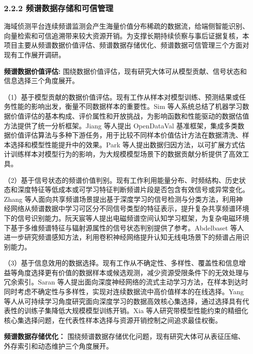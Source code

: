 \subsubsection{2.2.2 频谱数据存储和可信管理}

海域侦测平台连续频谱监测会产生海量价值分布稀疏的数据流，给端侧智能识别、向量检索和可信追溯带来较大资源开销。为支撑长期持续侦察与事后证据复核，本项目主要从频谱数据价值评估、频谱数据存储优化、频谱数据可信管理三个方面对现有工作展开调研。

\textbf{频谱数据价值评估:}
围绕数据价值评估，现有研究大体可从模型贡献、信号状态和信息选择三个角度展开。

（1）基于模型贡献的数据价值评估。现有工作从样本对模型训练、预测结果或任务性能的影响出发，衡量不同数据样本的重要性。Sim 等人\cite{SimXL22}系统总结了机器学习数据价值评估的基本构成、评价属性和开放挑战，为影响函数和性能驱动的数据估值方法提供了统一分析框架。Jiang 等人\cite{JiangLZK23}提出 OpenDataVal 基准框架，集成多类数据价值评估算法与多种下游任务，用于比较不同样本价值估计方法在数据清洗、样本选择和模型性能提升中的效果。Park 等人\cite{ParkGILM23}提出数据归因方法，以可扩展方式估计训练样本对模型行为的影响，为大规模模型场景下的数据贡献分析提供了高效工具。

（2）基于信号状态的频谱价值判别。现有工作利用能量分布、时频结构、历史状态和深度特征等低成本或可学习特征判断频谱片段是否包含有效信号或异常变化。Zhang 等人\cite{ZhangFKA21}面向共享频谱场景提出基于深度学习的信号检测与分类方法，利用神经网络从频谱数据中学习可区分不同信号类型的特征表示，提升复杂共享频谱环境下的信号识别能力。阮天宸等人\cite{RuanWZZH23}提出电磁频谱空间认知学习框架，为复杂电磁环境下基于多维频谱特征与辐射源属性的信号状态判别提供了参考。Abdelbaset 等人\cite{AbdelbasetKKHK24}进一步研究频谱感知方法，利用卷积神经网络提升认知无线电场景下的频谱占用识别能力。

（3）基于信息效用的数据选择。现有工作从不确定性、多样性、覆盖性和信息增益等角度选择更有价值的数据样本或候选观测，减少资源受限条件下的无效处理与冗余索引。Saran 等人\cite{SaranYK0A23}提出面向深度神经网络的流式主动学习方法，在样本到达时同时考虑不确定性与多样性，实现对连续数据流中高价值样本的在线选择。Yang 等人\cite{YangKM23}从可持续学习角度研究面向深度学习的数据高效核心集选择，通过选择具有代表性的训练子集降低大规模模型训练开销。Xia 等人\cite{XiaLZWWL24}研究带模型性能约束的精细化核心集选择问题，在代表性样本选择与资源开销控制之间追求最佳权衡。


\textbf{频谱数据存储优化：}
围绕频谱数据存储优化问题，现有研究大体可从表征压缩、外存索引和动态维护三个角度展开。

